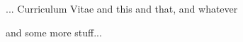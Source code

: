 




\fineFont {}

... Curriculum Vitae and this and that, and whatever

\normalFont \engrus and some more stuff...


